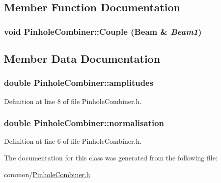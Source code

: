 \subsection{Member Function Documentation}
\hypertarget{classPinholeCombiner_aa231a8296706e8cf7666c0aebec1b19f}{
\subsubsection[{Couple}]{\setlength{\rightskip}{0pt plus 5cm}void PinholeCombiner::Couple ({\bf Beam} \& {\em Beam1})}}
\label{classPinholeCombiner_aa231a8296706e8cf7666c0aebec1b19f}


\subsection{Member Data Documentation}
\hypertarget{classPinholeCombiner_acb0d457aae985022003b7fc459763a7f}{
\subsubsection[{amplitudes}]{\setlength{\rightskip}{0pt plus 5cm}double {\bf PinholeCombiner::amplitudes}}}
\label{classPinholeCombiner_acb0d457aae985022003b7fc459763a7f}


Definition at line 8 of file PinholeCombiner.h.

\hypertarget{classPinholeCombiner_a1d43795d56c3a248709ff9aaa1097b85}{
\subsubsection[{normalisation}]{\setlength{\rightskip}{0pt plus 5cm}double {\bf PinholeCombiner::normalisation}}}
\label{classPinholeCombiner_a1d43795d56c3a248709ff9aaa1097b85}


Definition at line 6 of file PinholeCombiner.h.



The documentation for this class was generated from the following file:\begin{DoxyCompactItemize}
\item 
common/\hyperlink{PinholeCombiner_8h}{PinholeCombiner.h}\end{DoxyCompactItemize}
